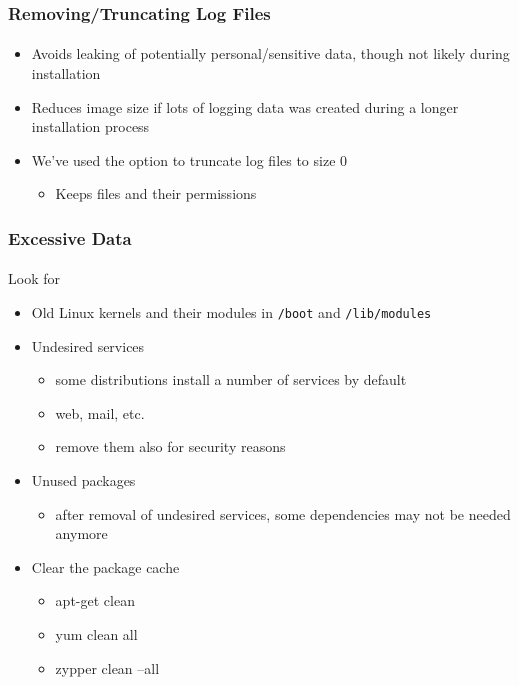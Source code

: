\begin{frame}
\frametitle{Removing/Truncating Log Files}
\framesubtitle{}
\begin{itemize}
\item Avoids leaking of potentially personal/sensitive data, though
  not likely during installation
\item Reduces image size if lots of logging data was created during a
  longer installation process
\item We've used the option to truncate log files to size 0
  \begin{itemize}
  \item Keeps files and their permissions
  \end{itemize}
\end{itemize}
\end{frame}

\begin{frame}
\frametitle{Excessive Data}
\framesubtitle{}
Look for
\begin{itemize}
\item Old Linux kernels and their modules in \texttt{/boot} and
  \texttt{/lib/modules}
\item Undesired services
  \begin{itemize}
  \item some distributions install a number of services by default
  \item web, mail, etc.
  \item remove them also for security reasons
  \end{itemize}
\item Unused packages
  \begin{itemize}
  \item after removal of undesired services, some dependencies may not
    be needed anymore
  \end{itemize}
\item Clear the package cache
  \begin{itemize}
  \item apt-get clean
  \item yum clean all
  \item zypper clean --all
  \end{itemize}
\end{itemize}
\end{frame}

